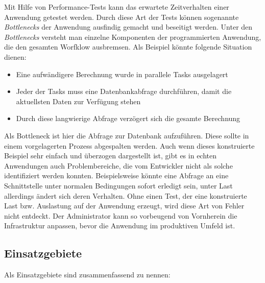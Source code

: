 Mit Hilfe von Performance-Tests kann das erwartete Zeitverhalten einer Anwendung getestet werden. 
Durch diese Art der Tests können sogenannte \textit{Bottlenecks} der Anwendung ausfindig gemacht und beseitigt werden. 
Unter den \textit{Bottlenecks} versteht man einzelne Komponenten der programmierten Anwendung, die den gesamten Worfklow ausbremsen. 
Als Beispiel könnte folgende Situation dienen:
\begin{itemize}
    \item Eine aufwändigere Berechnung wurde in parallele Tasks ausgelagert
    \item Jeder der Tasks muss eine Datenbankabfrage durchführen, damit die aktuellsten Daten zur Verfügung stehen
    \item Durch diese langwierige Abfrage verzögert sich die gesamte Berechnung
\end{itemize}
Als Bottleneck ist hier die Abfrage zur Datenbank aufzuführen.
Diese sollte in einem vorgelagerten Prozess abgespalten werden. 
Auch wenn dieses konstruierte Beispiel sehr einfach und überzogen dargestellt ist, gibt es in echten Anwendungen auch Problembereiche, die vom Entwickler nicht als solche identifiziert werden konnten.
Beispielsweise könnte eine Abfrage an eine Schnittstelle unter normalen Bedingungen sofort erledigt sein, unter Last allerdings ändert sich deren Verhalten.
Ohne einen Test, der eine konstruierte Last bzw. Auslastung auf der Anwendung erzeugt, wird diese Art von Fehler nicht entdeckt.
Der Administrator kann so vorbeugend von Vornherein die Infrastruktur anpassen, bevor die Anwendung im produktiven Umfeld ist.
 
\subsection{Einsatzgebiete}

Als Einsatzgebiete sind zusammenfassend zu nennen:

